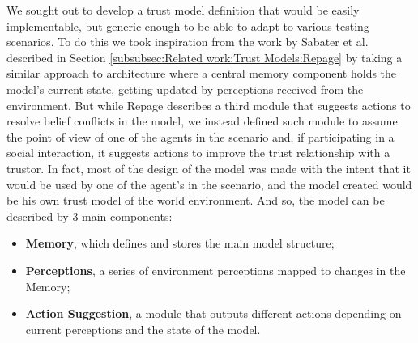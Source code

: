 \cleardoublepage
\label{chap:Trust Model}

We sought out to develop a trust model definition that would be easily implementable, but generic enough to be able to adapt to various testing scenarios. To do this we took inspiration from the work by Sabater et al.\cite{Sabater2006} described in Section \ref{subsubsec:Related work:Trust Models:Repage} by taking a similar approach to architecture where a central memory component holds the model's current state, getting updated by perceptions received from the environment. But while Repage describes a third module that suggests actions to resolve belief conflicts in the model, we instead defined such module to assume the point of view of one of the agents in the scenario and, if participating in a social interaction, it suggests actions to improve the trust relationship with a trustor. In fact, most of the design of the model was made with the intent that it would be used by one of the agent's in the scenario, and the model created would be his own trust model of the world environment. And so, the model can be described by 3 main components:
\begin{itemize}
    \item \textbf{Memory}, which defines and stores the main model structure;
    \item \textbf{Perceptions}, a series of environment perceptions mapped to changes in the Memory;
    \item \textbf{Action Suggestion}, a module that outputs different actions depending on current perceptions and the state of the model.
\end{itemize}

